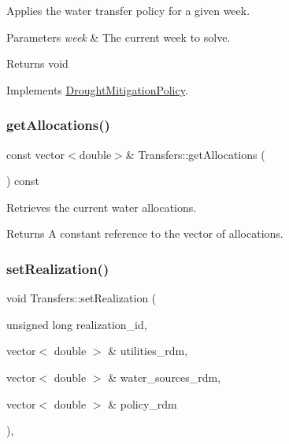 Applies the water transfer policy for a given week. 


\begin{DoxyParams}{Parameters}
{\em week} & The current week to solve.\\
\hline
\end{DoxyParams}
\begin{DoxyReturn}{Returns}
void 
\end{DoxyReturn}


Implements \mbox{\hyperlink{classDroughtMitigationPolicy_a76c1a85eaf7707306fe173b6437cc31d}{Drought\+Mitigation\+Policy}}.

\mbox{\label{classTransfers_abb5bd2978727424dc524c401dca0cbaf}} 
\subsubsection{\texorpdfstring{get\+Allocations()}{getAllocations()}}
{\footnotesize\ttfamily const vector$<$double$>$\& Transfers\+::get\+Allocations (\begin{DoxyParamCaption}{ }\end{DoxyParamCaption}) const}



Retrieves the current water allocations. 

\begin{DoxyReturn}{Returns}
A constant reference to the vector of allocations. 
\end{DoxyReturn}
\mbox{\label{classTransfers_a75342a7c14b2ff69eb2520de240a1131}} 
\subsubsection{\texorpdfstring{set\+Realization()}{setRealization()}}
{\footnotesize\ttfamily void Transfers\+::set\+Realization (\begin{DoxyParamCaption}\item[{unsigned long}]{realization\+\_\+id,  }\item[{vector$<$ double $>$ \&}]{utilities\+\_\+rdm,  }\item[{vector$<$ double $>$ \&}]{water\+\_\+sources\+\_\+rdm,  }\item[{vector$<$ double $>$ \&}]{policy\+\_\+rdm }\end{DoxyParamCaption})\hspace{0.3cm}{\ttfamily [override]}, {\ttfamily [virtual]}}



